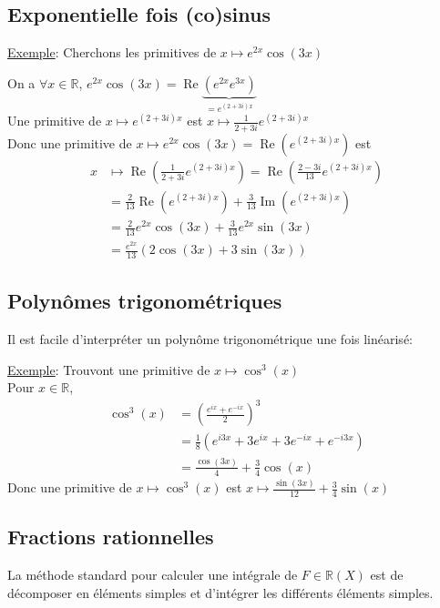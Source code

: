 \documentclass[10pt,a4paper]{article}
\theoremstyle{definition}
\DeclareMathOperator{\re}{Re}
\DeclareMathOperator{\im}{Im}
\begin{document}
\subsection{Exponentielle fois (co)sinus}
\noindent \uline{Exemple}: Cherchons les primitives de $x \mapsto e^{2x} \cos(3x)$ \medskip

\noindent On a $\forall x \in \mathbb{R}$, $e^{2x} \cos(3x) = \re\underbrace{(e^{2x} e^{3x})}_{= e^{(2 + 3i)x}}$ \\
Une primitive de $x \mapsto e^{(2 + 3i)x}$ est $x \mapsto \frac{1}{2 + 3i} e^{(2 + 3i)x}$ \\
Donc une primitive de $x \mapsto e^{2x} \cos(3x) = \re(e^{(2 + 3i)x})$ est
\begin{align*}
x &\mapsto \re\left(\frac{1}{2 + 3i}e^{(2 + 3i)x}\right) = \re\left(\frac{2 - 3i}{13} e^{(2 + 3i)x} \right)\\
&= \frac{2}{13}\re\left(e^{(2 + 3i)x}\right) + \frac{3}{13}\im\left(e^{(2 + 3i)x}\right) \\
&= \frac{2}{13}e^{2x}\cos(3x) + \frac{3}{13}e^{2x}\sin(3x) \\
&= \frac{e^{2x}}{13}(2 \cos(3x) + 3 \sin(3x))
\end{align*}

\pagebreak

\subsection{Polynômes trigonométriques}
Il est facile d'interpréter un polynôme trigonométrique une fois linéarisé: \medskip

\noindent \uline{Exemple}: Trouvont une primitive de $x \mapsto \cos^3(x)$ \\
Pour $x \in \mathbb{R}$,
\begin{align*}
\cos^3(x) &= \left(\frac{e^{ix} + e^{-ix}}{2}\right)^3 \\
&= \frac{1}{8}(e^{i3x} + 3e^{ix} + 3e^{-ix} + e^{-i3x}) \\
&= \frac{\cos(3x)}{4} + \frac{3}{4}\cos(x)
\end{align*}
Donc une primitive de $x \mapsto \cos^3(x)$ est $x \mapsto \frac{\sin(3x)}{12} + \frac{3}{4}\sin(x)$

\subsection{Fractions rationnelles}
La méthode standard pour calculer une intégrale de $F \in \mathbb{R}(X)$ est de décomposer en éléments simples et d'intégrer les différents éléments simples. \medskip
\end{document}
